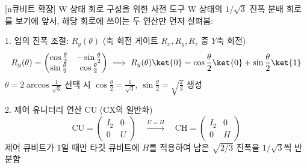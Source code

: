 \documentclass[aspectratio=169, 10pt]{beamer}
\begin{document}
\begin{frame}{[n큐비트 확장] W 상태 회로 구성을 위한 사전 도구}
    W 상태의 $1/\sqrt{3}$ 진폭 분배 회로를 보기에 앞서, 해당 회로에 쓰이는 두 연산만 먼저 살펴봄:
    \pause
    \vspace{0.1cm}
    \begin{qcblock}{1. 임의 진폭 조절: $R_y(\theta)$ (축 회전 게이트 $R_x, R_y, R_z$ 중 $Y$축 회전)}
        $$R_y(\theta) = \begin{pmatrix} \cos\frac{\theta}{2} & -\sin\frac{\theta}{2} \\ \sin\frac{\theta}{2} & \cos\frac{\theta}{2} \end{pmatrix} \implies R_y(\theta)\ket{0} = \cos\frac{\theta}{2}\ket{0} + \sin\frac{\theta}{2}\ket{1}$$
        $\theta = 2\arccos\frac{1}{\sqrt{3}}$ 선택 시 $\cos\frac{\theta}{2} = \frac{1}{\sqrt{3}}$, $\sin\frac{\theta}{2} = \sqrt{\frac{2}{3}}$ 생성
    \end{qcblock}
    \pause
    \vspace{0.1cm}
    \begin{qctip}{2. 제어 유니터리 연산 $\mathrm{CU}$ ($\mathrm{CX}$의 일반화)}
        $$\mathrm{CU} = \begin{pmatrix} I_2 & 0 \\ 0 & U \end{pmatrix} \quad \xrightarrow{U = H} \quad \mathrm{CH} = \begin{pmatrix} I_2 & 0 \\ 0 & H \end{pmatrix}$$
        제어 큐비트가 $1$일 때만 타깃 큐비트에 $H$를 적용하여 남은 $\sqrt{2/3}$ 진폭을 $1/\sqrt{3}$씩 반분함
    \end{qctip}
\end{frame}
\end{document}
